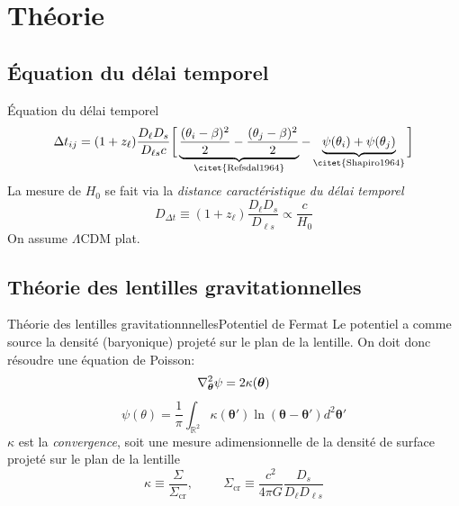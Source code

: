\documentclass{beamer}
\begin{document}
\section{Théorie}
\subsection{Équation du délai temporel}
\begin{frame}{Équation du délai temporel}
	\begin{equation}\label{eq:DelaiTemp} 
            \Delta t_{ij} = (1 + z_{\ell})\frac{D_\ell D_s}{D_{\ell s}c}
            \bigg[ \underbrace{\frac{(\theta_i - \beta)^2}{2} -
            \frac{(\theta_j - \beta)^2}{2}}_{\text{\citet{Refsdal1964}}} 
            -\underbrace{\psi(\theta_i) + \psi(\theta_j)}_{\text{\citet{Shapiro1964}}}
    \bigg]
	\end{equation}
La mesure de $H_0$ se fait via la \textit{distance caractéristique du délai temporel}
\begin{equation}\label{eq:Ddl} 
        D_{\Delta t} \equiv (1 + z_\ell)\frac{D_\ell D_s}{D_{\ell s}} \propto \frac{c}{H_0} 
\end{equation} 
On assume $\Lambda$CDM plat.
\end{frame}

\subsection{Théorie des lentilles gravitationnelles}
\begin{frame}{Théorie des lentilles gravitationnnelles}{Potentiel de Fermat}
Le potentiel a comme source la densité (baryonique) projeté sur le plan de la lentille. On doit donc résoudre une équation de Poisson:
\begin{equation}\label{eq:Poisson} 
        \laplacian_{\boldsymbol{\theta}} \psi = 2 \kappa(\boldsymbol{\theta}) 
\end{equation} 
       \begin{equation}\label{eq:potentiel} 
               \psi(\theta) = \frac{1}{\pi}\int_{\mathbb{R}^2} \kappa(\boldsymbol{\theta}')
               \ln(\boldsymbol{\theta} - \boldsymbol{\theta}') d^2\boldsymbol{\theta}'
       \end{equation}  
$\kappa$ est la \textit{convergence}, soit une mesure adimensionnelle de la densité de 
surface projeté sur le plan de la lentille 
\begin{equation}\label{eq:Kappa} 
        \kappa \equiv \frac{\Sigma}{\Sigma_{\text{cr}}},\hspace{1cm}
       \Sigma_{\text{cr}} \equiv \frac{c^2}{4 \pi G} 
       \frac{D_s}{D_\ell D_{\ell s}}
\end{equation} 
\end{frame}
\end{document}
